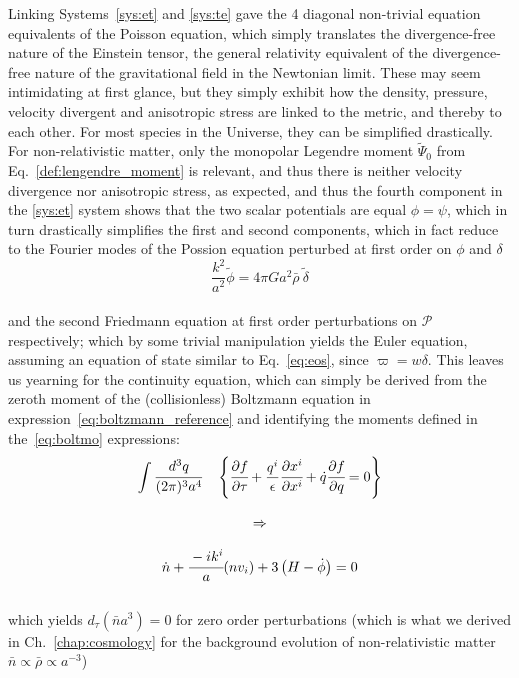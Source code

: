 Linking Systems~\ref{sys:et} and \ref{sys:te} gave the 4 diagonal non-trivial equation equivalents of the Poisson equation, which simply translates the divergence-free nature of the Einstein tensor, the general relativity equivalent of the divergence-free nature of the gravitational field in the Newtonian limit. These may seem intimidating at first glance, but they simply exhibit how the density, pressure, velocity divergent and anisotropic stress are linked to the metric, and thereby to each other. For most species in the Universe, they can be simplified drastically. For non-relativistic matter, only the monopolar Legendre moment $\tilde{\Psi}_0$ from Eq.~\ref{def:lengendre_moment} is relevant, and thus there is neither velocity divergence nor anisotropic stress, as expected, and thus the fourth component in the \ref{sys:et} system shows that the two scalar potentials are equal $\phi = \psi$, which in turn drastically simplifies the first and second components, which in fact reduce to  the Fourier modes of the Possion equation perturbed at first order on $\phi$ and $\delta$ \\
\begin{equation}
\frac{k^2}{a^2} \tilde{\phi} = 4 \pi G a^2 \bar{\rho}~ \tilde{\delta}
\end{equation} \\ and the second Friedmann equation at first order perturbations on $\mathcal{P}$ respectively; which by some trivial manipulation yields the Euler equation, assuming an equation of state similar to Eq.~\ref{eq:eos}, since $\varpi = w \delta$. This leaves us yearning for the continuity equation, which can simply be derived from the zeroth moment of the (collisionless) Boltzmann equation in expression~\ref{eq:boltzmann_reference} and identifying the moments defined in the~\ref{eq:boltmo} expressions:\\
\begin{equation}
\begin{array}{c}
\displaystyle \int \cfrac{d^3 q}{(2 \pi)^3 a^4}~~~\left\{ \cfrac{\partial f}{\partial \tau} + \frac{q^i}{\epsilon}\cfrac{\partial x^i}{\partial x^i} + \dot{q} \cfrac{\partial f}{\partial q} = 0 \right\} \\
\\
\Rightarrow\\
\\
\dot{n} + \cfrac{-ik^i}{a} (n v_i) + 3 \left( H - \dot{\phi}\right) = 0 \\
\end{array}
\end{equation} \\ which yields $d_\tau (\bar{n} a^3) = 0$ for zero order perturbations (which is what we derived in Ch.~\ref{chap:cosmology} for the background evolution of non-relativistic matter $\bar{n} \propto \bar{\rho} \propto a^{-3}$) \\
